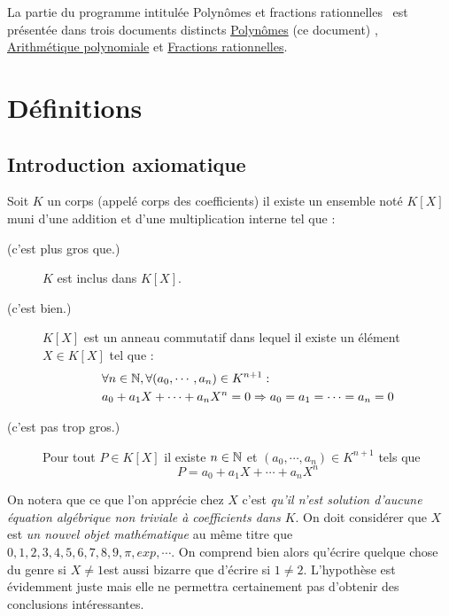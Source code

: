 
%


La partie du programme intitulée \og Polynômes et fractions rationnelles\fg~ est présentée dans trois documents distincts \href{\baseurl C1622.pdf}{Polynômes} (ce document) , \href{\baseurl C2160.pdf}{Arithmétique polynomiale} et \href{\baseurl C1623.pdf}{Fractions rationnelles}.

\section{Définitions}
\subsection{Introduction axiomatique}
\begin{frame}
  \begin{pa}
   Soit $K$ un corps (appelé corps des coefficients)  il existe un ensemble noté $K[X]$ muni d'une addition et d'une multiplication interne tel que :
\begin{description}
 \item[\small{(c'est plus gros que.)}] $K$ est inclus dans $K[X]$.
 \item[\small{(c'est bien.)}]$K[X]$ est un anneau commutatif dans lequel il existe un élément $X\in K[X]$ tel que :
\begin{align*}
 &\forall n \in \mathbb{N} , \forall (a_0,\cdots,a_n)\in K^{n+1} :\\
&a_0+a_1X + \cdots + a_nX^n=0 \Rightarrow a_0=a_1=\cdots=a_n=0
\end{align*}
\item[\small{(c'est pas trop gros.)}]Pour tout $P\in K[X]$ il existe $n\in \mathbb{N}$ et $(a_0,\cdots,a_n)\in K^{n+1}$ tels que
\begin{displaymath}
 P = a_0+a_1X + \cdots + a_nX^n
\end{displaymath}
 \end{description}
  \end{pa}
 \end{frame}

On notera que ce que l'on apprécie chez $X$ c'est \emph{qu'il n'est solution d'aucune équation algébrique non triviale à coefficients dans $K$}. On doit considérer que $X$ est \emph{un nouvel objet mathématique} au même titre que $0,1,2,3,4,5,6,7,8,9,\pi,exp,\cdots$. On comprend bien alors qu'écrire quelque chose du genre \og si $X\neq1$\fg est aussi bizarre que d'écrire \og si $1\neq2$\fg. L'hypothèse est évidemment juste mais elle ne permettra certainement pas d'obtenir des conclusions intéressantes.

